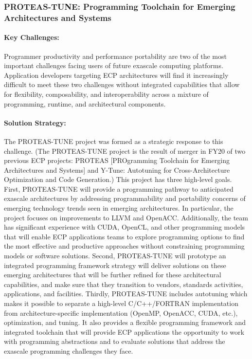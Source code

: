 \subsubsection{ PROTEAS-TUNE: Programming Toolchain for Emerging Architectures and Systems} 

\paragraph{Key  Challenges:}
Programmer productivity and performance portability are two of the most important challenges facing users of future exascale computing platforms. Application developers targeting ECP architectures will find it increasingly difficult to meet these two challenges without integrated capabilities that allow for flexibility, composability, and interoperability across a mixture of programming, runtime, and architectural components. 

\paragraph{Solution Strategy:}
The PROTEAS-TUNE project was formed as a strategic response to this challenge. (The PROTEAS-TUNE project is the result of merger in FY20 of two previous ECP projects: PROTEAS [PROgramming Toolchain for Emerging Architectures and Systems] and Y-Tune: Autotuning for Cross-Architecture Optimization and Code Generation.) 
This project has three high-level goals. First, PROTEAS-TUNE will provide a programming pathway to anticipated exascale architectures by addressing programmability and portability concerns of emerging technology trends seen in emerging architectures. In particular, the project focuses on improvements to LLVM and OpenACC. Additionally, the team has significant experience with CUDA, OpenCL, and other programming models that will enable ECP applications teams to explore programming options to find the most effective and productive approaches without constraining programming models or software solutions. Second, PROTEAS-TUNE will prototype an integrated programming framework strategy will deliver solutions on these emerging architectures that will be further refined for these architectural capabilities, and make sure that they transition to vendors, standards activities, applications, and facilities. Thirdly, PROTEAS-TUNE includes autotuning which makes it possible to separate a high-level C/C++/FORTRAN implementation from architecture-specific implementation (OpenMP, OpenACC, CUDA, etc.), optimization, and tuning. It also provides a flexible programming framework and integrated toolchain that will provide ECP applications the opportunity to work with programming abstractions and to evaluate solutions that address the exascale programming challenges they face. 


